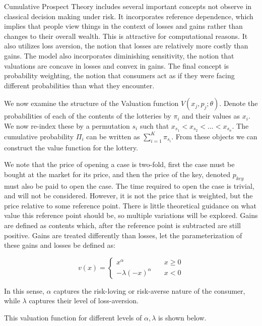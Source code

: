 \documentclass[12pt]{paper}
\begin{document}
Cumulative Prospect Theory includes several important concepts not
observe in classical decision making under risk. It incorporates
reference dependence, which implies that people view things in the
context of losses and gains rather than changes to their overall
wealth. This is attractive for computational reasons. It also utilizes
loss aversion, the notion that losses are relatively more costly than
gains. The model also incorporates diminishing sensitivity, the notion
that valuations are concave in losses and convex in gains. The final
concept is probability weighting, the notion that consumers act as if
they were facing different probabilities than what they encounter.

We now examine the structure of the Valuation function $V( x_j,
p_j; \theta)$. Denote the probabilities of each of the contents of the
lotteries by $\pi_i$ and their values as $x_i$. We now re-index these by
a permutation $s_i$ such that $x_{s_1} < x_{s_2} < ... < x_{s_n}$. The
cumulative probability $\Pi_i$ can be written as $\sum_{i=1}^K
\pi_{s_i}$. From these objects we can construct the value function for
the lottery.

We note that the price of opening a case is two-fold, first the case
must be bought at the market for its price, and then the price of the
key, denoted $p_{key}$ must also be paid to open the case. The time
required to open the case is trivial, and will not be
considered. However, it is not the price that is weighted, but the
price relative to some reference point. There is little theoretical
guidance on what value this reference point should be, so multiple
variations will be explored. Gains are defined as contents
which, after the reference point is subtracted are still
positive. Gains are treated differently than losses, let the
parameterization of these gains and losses be defined as:

\begin{equation*}
  v(x) =
  \begin{cases}
    x^\alpha \quad &x \geq 0\\
    -\lambda(-x)^\alpha \quad &x < 0
  \end{cases}
\end{equation*}

In this sense, $\alpha$ captures the risk-loving or risk-averse nature of
the consumer, while $\lambda$ captures their level of loss-aversion.

This valuation function for different levels of $\alpha,\lambda$ is shown below.
\end{document}
